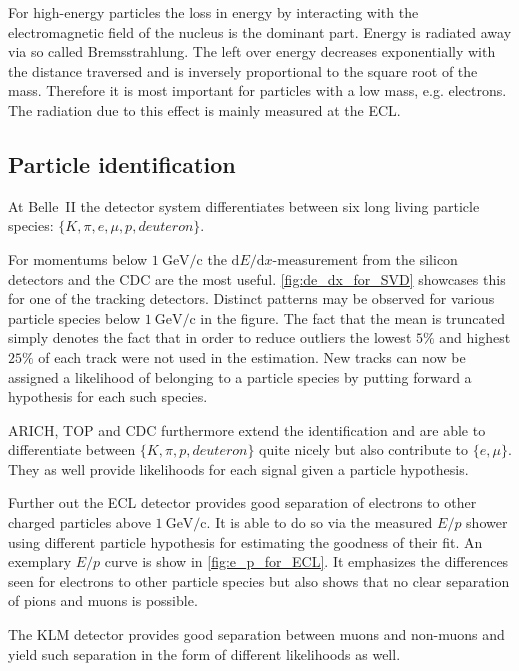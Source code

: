 For high-energy particles the loss in energy by interacting with the electromagnetic field of the nucleus is the dominant part. Energy is radiated away via so called Bremsstrahlung. The left over energy decreases exponentially with the distance traversed and is inversely proportional to the square root of the mass. Therefore it is most important for particles with a low mass, e.g. electrons.
The radiation due to this effect is mainly measured at the ECL.

\subsection{Particle identification}
\label{subsec:particle_identification}

At Belle~\RN{2} the detector system differentiates between six long living particle species: $\{K, \pi, e, \mu, p, deuteron\}$.

For momentums below $1 \mathrm{~GeV/c}$ the $\mathrm{d}E/\mathrm{d}x$-measurement from the silicon detectors and the CDC are the most useful. \autoref{fig:de_dx_for_SVD} showcases this for one of the tracking detectors. Distinct patterns may be observed for various particle species below $1 \mathrm{~GeV/c}$ in the figure. The fact that the mean is truncated simply denotes the fact that in order to reduce outliers the lowest $5\%$ and highest $25\%$ of each track were not used in the estimation.
New tracks can now be assigned a likelihood of belonging to a particle species by putting forward a hypothesis for each such species.

ARICH, TOP and CDC furthermore extend the identification and are able to differentiate between $\{K, \pi, p, deuteron\}$ quite nicely but also contribute to $\{e, \mu\}$. They as well provide likelihoods for each signal given a particle hypothesis.

Further out the ECL detector provides good separation of electrons to other charged particles above $1 \mathrm{~GeV/c}$. It is able to do so via the measured $E/p$ shower using different particle hypothesis for estimating the goodness of their fit. An exemplary $E/p$ curve is show in \autoref{fig:e_p_for_ECL}. It emphasizes the differences seen for electrons to other particle species but also shows that no clear separation of pions and muons is possible.

The KLM detector provides good separation between muons and non-muons and yield such separation in the form of different likelihoods as well.

